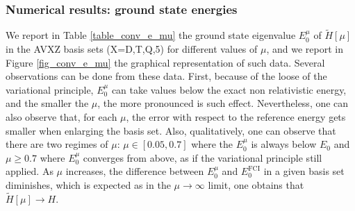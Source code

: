 \documentclass[aip,jcp,reprint,noshowkeys,superscriptaddress]{revtex4-1}
\begin{document}
\subsubsection{Numerical results: ground state energies}
\label{sec:total_e}
We report in Table \ref{table_conv_e_mu} the ground state eigenvalue $E_0^\mu$ of $\tilde{H}[\mu]$ in the AVXZ basis sets (X=D,T,Q,5) for different values of $\mu$, and we report in Figure \ref{fig_conv_e_mu} the graphical representation of such data. 
Several observations can be done from these data. First, because of the loose of the variational principle, $E_0^{\mu}$ can take values below the exact non relativistic energy, and the smaller the $\mu$, the more pronounced is such effect. 
Nevertheless, one can also observe that, for each $\mu$, the error with respect to the reference energy gets smaller  
when enlarging the basis set. Also, qualitatively, one can observe that there are two regimes of $\mu$: $\mu \in[0.05,0.7]$ where the $E_0^\mu$ is always below $E_0$ and $\mu\ge 0.7$ where $E_0^\mu$ converges from above, as if the variational principle still applied. 
As $\mu$ increases, the difference between $E_0^\mu$ and $E_0^\text{FCI}$ in a given basis set diminishes, 
which is expected as in the $\mu \rightarrow \infty$ limit, one obtains that  $\tilde{H}[\mu] \rightarrow H$. 
\end{document}

